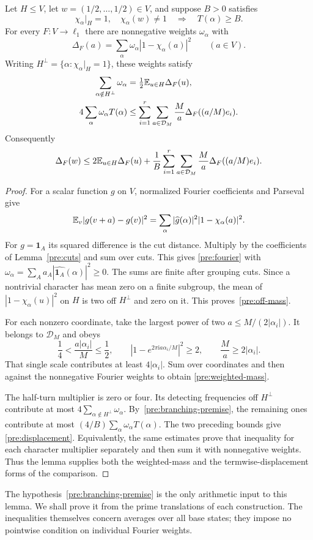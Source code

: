 \begin{lemma}\label{pre:weighted-circle}
Let $H\leq V$, let $w=(1/2,\ldots,1/2)\in V$, and suppose $B>0$ satisfies
\begin{equation}\label{pre:branching-premise}
 \chi_\alpha|_H=1,\quad \chi_\alpha(w)\ne1
 \quad\Longrightarrow\quad T(\alpha)\geq B.
\end{equation}
For every $F:V\to\ell_1$ there are nonnegative weights $\omega_\alpha$ with
\begin{equation}\label{pre:fourier}
 \Delta_F(a)=\sum_\alpha\omega_\alpha|1-\chi_\alpha(a)|^2
 \qquad(a\in V).
\end{equation}
Writing $H^\perp=\{\alpha:\chi_\alpha|_H=1\}$, these weights satisfy
\begin{align}
 \sum_{\alpha\notin H^\perp}\omega_\alpha
   &=\tfrac12\mathbb E_{u\in H}\Delta_F(u),\label{pre:off-mass}\\
 4\sum_\alpha\omega_\alpha T(\alpha)
   &\leq\sum_{i=1}^r\sum_{a\in\mathcal D_M}
        \frac Ma\Delta_F((a/M)e_i).\label{pre:weighted-mass}
\end{align}
Consequently
\begin{equation}\label{pre:displacement}
 \Delta_F(w)\leq2\mathbb E_{u\in H}\Delta_F(u)
 +\frac1B\sum_{i=1}^r\sum_{a\in\mathcal D_M}
        \frac Ma\Delta_F((a/M)e_i).
\end{equation}
\end{lemma}
\begin{proof}
For a scalar function $g$ on $V$, normalized Fourier coefficients and
Parseval give
\[
 \mathbb E_v|g(v+a)-g(v)|^2
 =\sum_\alpha|\widehat g(\alpha)|^2|1-\chi_\alpha(a)|^2.
\]
For $g=\mathbf1_A$ its squared difference is the cut distance. Multiply
by the coefficients of Lemma~\ref{pre:cuts} and sum over cuts. This gives
\eqref{pre:fourier} with
$\omega_\alpha=\sum_Aa_A|\widehat{\mathbf1_A}(\alpha)|^2\geq0$.
The sums are finite after grouping cuts. Since a nontrivial character has
mean zero on a finite subgroup, the mean of $|1-\chi_\alpha(u)|^2$ on $H$
is two off $H^\perp$ and zero on it. This proves~\eqref{pre:off-mass}.

For each nonzero coordinate, take the largest power of two
$a\leq M/(2|\alpha_i|)$. It belongs to $\mathcal D_M$ and obeys
\[
 \frac14<\frac{a|\alpha_i|}{M}\leq\frac12,
 \qquad |1-e^{2\pi\mathrm i a\alpha_i/M}|^2\geq2,
 \qquad \frac Ma\geq2|\alpha_i|.
\]
That single scale contributes at least $4|\alpha_i|$. Sum over coordinates
and then against the nonnegative Fourier weights to obtain
\eqref{pre:weighted-mass}.

The half-turn multiplier is zero or four. Its detecting frequencies off
$H^\perp$ contribute at most $4\sum_{\alpha\notin H^\perp}\omega_\alpha$.
By~\eqref{pre:branching-premise}, the remaining ones contribute at most
$(4/B)\sum_\alpha\omega_\alpha T(\alpha)$. The two preceding bounds give
\eqref{pre:displacement}. Equivalently, the same estimates prove that
inequality for each character multiplier separately and then sum it with
nonnegative weights. Thus the lemma supplies both the weighted-mass and
the termwise-displacement forms of the comparison.
\end{proof}

The hypothesis~\eqref{pre:branching-premise} is the only arithmetic input
to this lemma. We shall prove it from the prime translations of each
construction. The inequalities themselves concern averages over all base
states; they impose no pointwise condition on individual Fourier weights.
